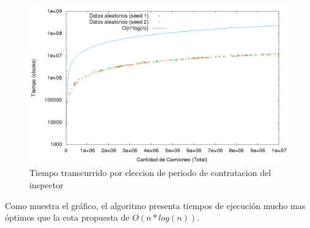 \begin{center}
\begin{figure}[h!]
\includegraphics[scale=0.4]{./img/ej1_chart.png}
\caption{Tiempo transcurrido por eleccion de periodo de contratacion del inspector}
\end{figure}
\end{center}

Como muestra el gr\'afico, el algoritmo presenta tiempos de ejecuci\'on mucho mas \'optimos que la cota propuesta de $O(n*log(n))$.
